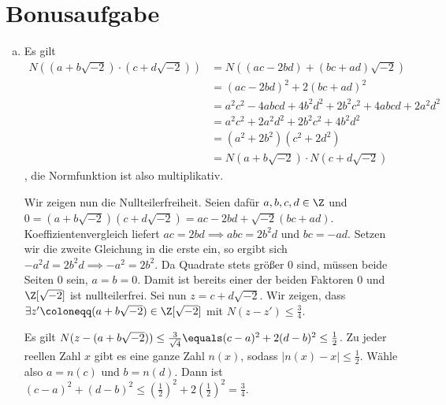 \documentclass{article}
\begin{document}
    \section*{Bonusaufgabe}
    \begin{enumerate}[(a)]
        \item {}
        Es gilt
        \begin{align*}
            N((a + b\sqrt{-2}) \cdot (c + d\sqrt{-2})) &= N((ac - 2bd) + (bc + ad)\sqrt{-2})\\
            &= (ac - 2bd)^2 + 2 (bc + ad)^2\\
            &= a^2c^2 - 4abcd + 4b^2d^2 + 2b^2c^2 + 4abcd + 2a^2d^2\\
            &= a^2c^2 + 2a^2d^2 + 2b^2c^2 + 4b^2d^2\\
            &= (a^2 + 2b^2)(c^2 + 2d^2)\\
            &= N(a + b\sqrt{-2}) \cdot N(c + d \sqrt{-2})
        \end{align*}, die Normfunktion ist also multiplikativ.
        
        Wir zeigen nun die Nullteilerfreiheit.
        Seien dafür $a, b, c, d\in \Z$ und $ 0 = (a + b\sqrt{-2})(c + d\sqrt{-2}) = ac -2bd + \sqrt{-2}(bc + ad)$. Koeffizientenvergleich liefert $ac = 2bd \implies abc = 2b^2d$ und $bc = -ad$. Setzen wir die zweite Gleichung in die erste ein, so ergibt sich $-a^2 d = 2b^2 d \implies -a^2 = 2b^2$. Da Quadrate stets größer 0 sind, müssen beide Seiten 0 sein, $a = b = 0$. Damit ist bereits einer der beiden Faktoren 0 und $\Z[\sqrt{-2}]$ ist nullteilerfrei.
        Sei nun $z = c + d\sqrt{-2}$. Wir zeigen, dass $\exists z' \coloneqq (a + b \sqrt{-2})\in \Z[\sqrt{-2}]$ mit $N(z - z') \leq \frac{3}{4}$. 
        
        Es gilt $N(z - (a +b\sqrt{-2})) \leq \frac{3}{\sqrt{4}} \equals (c-a)^2 + 2(d-b)^2 \leq \frac{1}{2}$. Zu jeder reellen Zahl $x$ gibt es eine ganze Zahl $n(x)$, sodass $|n(x) - x| \leq \frac{1}{2}$. Wähle also $a = n(c)$ und $b = n(d)$. Dann ist $(c-a)^2 + (d-b)^2 \leq \left(\frac{1}{2}\right)^2 + 2\left(\frac{1}{2}\right)^2 = \frac{3}{4}$.


\end{enumerate}
\end{document}
